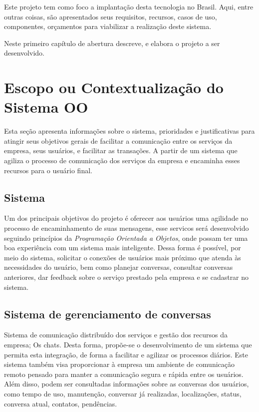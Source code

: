 Este projeto tem como foco a implantação desta tecnologia no Brasil. Aqui, entre outras coisas, são apresentados seus requisitos, recursos, casos de uso, componentes, orçamentos para viabilizar a realização deste sistema.



Neste primeiro capítulo de abertura descreve, e elabora o projeto a ser desenvolvido.


\section{Escopo ou Contextualiza\c{c}\~{a}o do Sistema OO}
Esta seção apresenta informações sobre o sistema, prioridades e justificativas para atingir seus objetivos gerais de facilitar a comunicação entre os serviços da empresa, seus usuários, e facilitar as transações. A partir de um sistema que agiliza o processo de comunicação dos serviços da empresa e encaminha esses recursos para o usuário final.
\subsection{Sistema}
Um dos principais objetivos do projeto é oferecer aos usuários uma agilidade no processo de encaminhamento de suas mensagens, esse servicos será desenvolvido seguindo princípios da \textit{Programação Orientada a Objetos}, onde possam ter uma boa experiência com um sistema mais inteligente.
Dessa forma é possível, por meio do sistema, solicitar o conexões de usuários mais próximo que atenda às necessidades do usuário, bem como planejar conversas, consultar conversas anteriores, dar feedback sobre o serviço prestado pela empresa e se cadastrar no sistema.


\subsection{Sistema de gerenciamento de conversas}
Sistema de comunicação distribuído dos serviços e gestão dos recursos da empresa; Os chats. Desta forma, propõe-se o desenvolvimento de um sistema que permita esta integração, de forma a facilitar e agilizar os processos diários. Este sistema também visa proporcionar à empresa um ambiente de comunicação remoto pensado para manter a comunicação segura e rápida entre os usuários. Além disso, podem ser consultadas informações sobre as conversas dos usuários, como tempo de uso, manutenção, conversar já realizadas, localizações, status, conversa atual, contatos, pendências.


